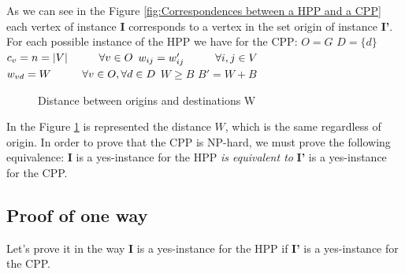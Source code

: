 \documentclass[12pt, a4paper,twoside]{memoir}
\newcommand{\newpar}{\vskip 0.2in \noindent}
\newcommand\tab[1][1cm]{\hspace*{#1}}
\begin{document}
	\noindent As we can see in the Figure \ref{fig:Correspondences between a HPP and a CPP} each vertex of instance \textbf{I} corresponds to a vertex in the set origin of instance \textbf{I'}. \newline
	For each possible instance of the HPP we have for the CPP: \newline
	\tab $O=G$\newline
	\tab $D=\{d\}$\newline
	\tab $c_v=n=|V| \tab \forall v\in O$ \newline
	\tab $w_{ij}=w'_{ij} \tab \forall i,j\in V$\newline
	\tab $w_{vd}= W \tab \forall v\in O,\forall d\in D$\newline
	\tab $W\ge B$ \newline
	\tab $B'=W+B$
	
	\begin{figure}[H]
		\centering
		\caption{Distance between origins and destinations W}
		\label{fig:Distance between origins and destinations W}
	\end{figure}
	
	\noindent In the Figure \ref{fig:Distance between origins and destinations W} is represented the distance $W$, which is the same regardless of origin.
	\newpar
	In order to prove that the CPP is NP-hard, we must prove the following equivalence: \newline
	\textbf{I} is a yes-instance for the HPP \textit{is equivalent to} \textbf{I'} is a yes-instance for the CPP.
	
	\subsection{Proof of one way}
	\label{subsec:Proof of one way}
	
	Let's prove it in the way \textbf{I} is a yes-instance for the HPP if \textbf{I'} is a yes-instance for the CPP.
	
\end{document}
